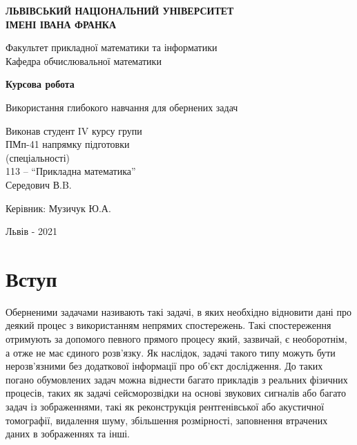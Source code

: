 \documentclass[14pt,a4paper]{extarticle}
\newcounter{e}
\newcounter{tabl}
\numberwithin{equation}{section}
\numberwithin{figure}{section}
\begin{document}
	\thispagestyle{empty}
	\begin{center}
		{\textbf{ЛЬВІВСЬКИЙ НАЦІОНАЛЬНИЙ УНІВЕРСИТЕТ \\ ІМЕНІ ІВАНА ФРАНКА}}\par
		{Факультет прикладної математики та інформатики \\ Кафедра обчислювальної математики}\par
		\vspace{40mm}
		{\textbf{\huge{Курсова робота}}}\par
		\vspace{5mm}
		{\large{Використання глибокого навчання для обернених задач}}\par
		\vspace{5mm}\par %
	\end{center}
	
	\vfill
	\vskip80pt
	
	\begin{flushleft}
		\hskip 8cm 
		Виконав студент IV курсу групи
		\\ \hskip8cm
		ПМп-41 напрямку підготовки 
		\\ \hskip8cm
		(спеціальності)
		\\ \hskip8cm
		113 -- ``Прикладна математика''
		\\ \hskip8cm
		Середович В.B.
	\end{flushleft}
	\begin{flushleft}
		\hskip8cm 
		Керівник: Музичук Ю.А.
	\end{flushleft}
	
	\vfill
	
	\begin{center}
		\large
		Львів - 2021
	\end{center}


	\newpage
	\thispagestyle{empty}
	\tableofcontents

	\newpage
	\thispagestyle{empty}
	\section*{Вступ}
	\begin{center}\end{center}
	
	Оберненими задачами називають такі задачі, в яких необхідно відновити дані про деякий процес з використанням непрямих спостережень. Такі спостереження отримують за допомого певного прямого процесу який, зазвичай, є необоротнім, а отже не має єдиного розв'язку. Як наслідок, задачі такого типу можуть бути нерозв'язними без додаткової інформації про об'єкт дослідження. До таких погано обумовлених задач можна віднести багато прикладів з реальних фізичних процесів, таких як задачі сейсморозвідки на основі звукових сигналів або багато задач із зображеннями, такі як реконструкція рентгенівської або акустичної томографії, видалення шуму, збільшення розмірності, заповнення втрачених даних в зображеннях та інші. 
	
\end{document}
